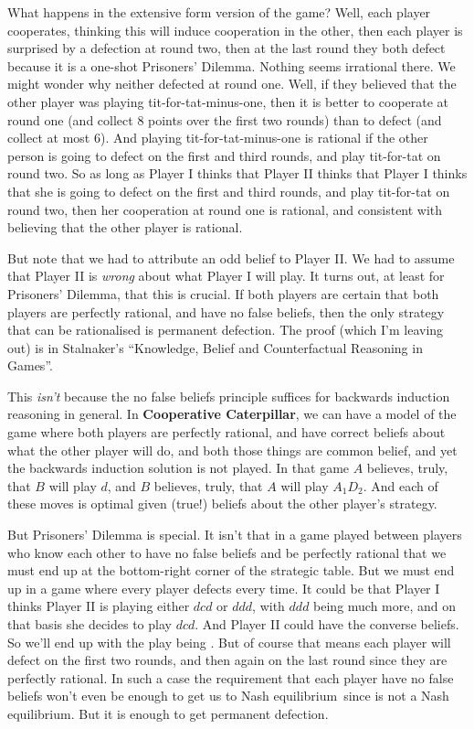 \documentclass[openany]{book}
\newcommand{\eqm}{equilibrium}
\begin{document}
What happens in the extensive form version of the game? Well, each player cooperates, thinking this will induce cooperation in the other, then each player is surprised by a defection at round two, then at the last round they both defect because it is a one-shot Prisoners' Dilemma. Nothing seems irrational there. We might wonder why neither defected at round one. Well, if they believed that the other player was playing tit-for-tat-minus-one, then it is better to cooperate at round one (and collect 8 points over the first two rounds) than to defect (and collect at most 6). And playing tit-for-tat-minus-one is rational if the other person is going to defect on the first and third rounds, and play tit-for-tat on round two. So as long as Player I thinks that Player II thinks that Player I thinks that she is going to defect on the first and third rounds, and play tit-for-tat on round two, then her cooperation at round one is rational, and consistent with believing that the other player is rational.

But note that we had to attribute an odd belief to Player II. We had to assume that Player II is \textit{wrong} about what Player I will play. It turns out, at least for Prisoners' Dilemma, that this is crucial. If both players are certain that both players are perfectly rational, and have no false beliefs, then the only strategy that can be rationalised is permanent defection. The proof (which I'm leaving out) is in Stalnaker's ``Knowledge, Belief and Counterfactual Reasoning in Games''.

This \textit{isn't} because the no false beliefs principle suffices for backwards induction reasoning in general. In \textbf{Cooperative Caterpillar}, we can have a model of the game where both players are perfectly rational, and have correct beliefs about what the other player will do, and both those things are common belief, and yet the backwards induction solution is not played. In that game $A$ believes, truly, that $B$ will play $d$, and $B$ believes, truly, that $A$ will play $A_1D_2$. And each of these moves is optimal given (true!) beliefs about the other player's strategy.

But Prisoners' Dilemma is special. It isn't that in a game played between players who know each other to have no false beliefs and be perfectly rational that we must end up at the bottom-right corner of the strategic table. But we must end up in a game where every player defects every time. It could be that Player I thinks Player II is playing either $dcd$ or $ddd$, with $ddd$ being much more, and on that basis  she decides to play $dcd$. And Player II could have the converse beliefs. So we'll end up with the play being . But of course that means each player will defect on the first two rounds, and then again on the last round since they are perfectly rational. In such a case the requirement that each player have no false beliefs won't even be enough to get us to Nash \eqm\, since  is not a Nash \eqm. But it is enough to get permanent defection.
\end{document}
